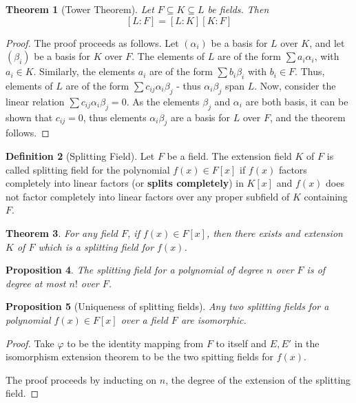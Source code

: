 \documentclass[10pt, oneside, reqno]{amsart}
\theoremstyle{plain}%
\newtheorem{thm}{Theorem}[section]
\newtheorem{prop}[thm]{Proposition}
\theoremstyle{definition}
\newtheorem{defn}[thm]{Definition}
\theoremstyle{remark}
\newcommand{\al}{\alpha}
\newcommand{\xdeg}[2]{[#1 : #2]}
\begin{document}
\begin{thm}[Tower Theorem]
	Let $F \subseteq K \subseteq L$ be fields. Then\[
		\xdeg{L}{F} = \xdeg{L}{K} \xdeg{K}{F}
	\]
\end{thm}
\begin{proof}
	The proof proceeds as follows.  Let $(\alpha_i)$ be a basis for $L$ over $K$, and let $(\beta_i)$ be a basis for $K$ over $F$. The elements of $L$ are of the form $\sum a_i \alpha_i$, with $a_i \in K$.  Similarly, the elements $a_i$ are of the form $\sum b_i \beta_i$ with $b_i \in F$.  Thus, elements of $L$ are of the form $\sum c_{ij} \alpha_i \beta_j$ - thus $\alpha_i \beta_j$ span $L$.  Now, consider the linear relation $\sum c_{ij} \al_i \beta_j = 0$.  As the elements $\beta_j$ and $\alpha_i$ are both basis, it can be shown that $c_{ij} = 0$, thus elements $\alpha_i \beta_j$ are a basis for $L$ over $F$, and the theorem follows.
\end{proof}

\begin{defn}[Splitting Field]
	Let $F$ be a field.  The extension field $K$ of $F$ is called splitting field for the polynomial $f(x) \in F[x]$ if $f(x)$ factors completely into linear factors (or \textbf{splits completely}) in $K[x]$ and $f(x)$ does not factor completely into linear factors over any proper subfield of $K$ containing $F$.
\end{defn}

\begin{thm}
	For any field $F$, if $f(x) \in F[x]$, then there exists and extension $K$ of $F$ which is a splitting field for $f(x)$.
\end{thm}

\begin{prop}
	The splitting field for a polynomial of degree $n$ over $F$ is of degree at most $n!$ over $F$.
\end{prop}


\begin{prop}[Uniqueness of splitting fields]
	Any two splitting fields for a polynomial $f(x) \in F[x]$ over a field $F$ are isomorphic.
\end{prop}

\begin{proof}
	Take $\varphi$ to be the identity mapping from $F$ to itself and $E, E'$ in the isomorphism extension theorem to be the two spitting fields for $f(x)$. 
	
	The proof proceeds by inducting on $n$, the degree of the extension of the splitting field.  
\end{proof}
\end{document}
